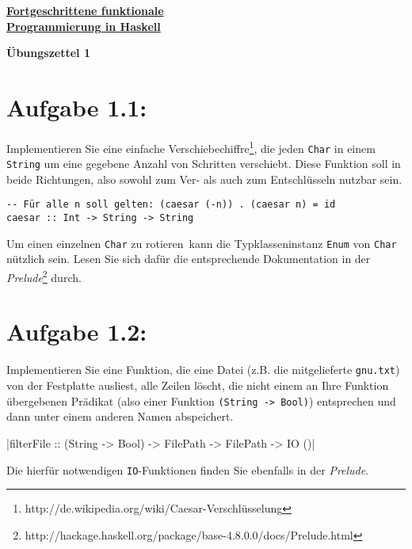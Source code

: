 \documentclass[a4paper,10pt]{scrartcl}
\newcommand{\underfat}[1]{\underline{\textbf{#1}}}
\newcommand{\theuebungszettel}{1}
\begin{document}
\begin{center}
  \begin{huge}
    \underfat{Fortgeschrittene funktionale}\\
    \underfat{Programmierung in Haskell}\\
  \end{huge}
\begin{LARGE}
\textbf{Übungszettel \theuebungszettel}

\end{LARGE}
\end{center}

\section*{Aufgabe \theuebungszettel.1:}

Implementieren Sie eine einfache Verschiebechiffre\footnote{http://de.wikipedia.org/wiki/Caesar-Verschlüsselung}, die jeden \texttt{Char} in einem \texttt{String} um eine gegebene Anzahl von Schritten verschiebt. Diese Funktion soll \glqq in beide Richtungen\grqq , also sowohl zum Ver- als auch zum Entschlüsseln nutzbar sein.

\begin{verbatim}
-- Für alle n soll gelten: (caesar (-n)) . (caesar n) = id 
caesar :: Int -> String -> String
\end{verbatim}

Um einen einzelnen \texttt{Char} zu \glqq rotieren\grqq\ kann die Typklasseninstanz \texttt{Enum} von \texttt{Char} nützlich sein. Lesen Sie sich dafür die entsprechende Dokumentation in der \emph{Prelude}\footnote{http://hackage.haskell.org/package/base-4.8.0.0/docs/Prelude.html} durch.

\section*{Aufgabe \theuebungszettel.2:}

Implementieren Sie eine Funktion, die eine Datei (z.B. die mitgelieferte \texttt{gnu.txt}) von der Festplatte ausliest, alle Zeilen löscht, die nicht einem an Ihre Funktion übergebenen Prädikat (also einer Funktion \texttt{(String -> Bool)}) entsprechen und dann unter einem anderen Namen abspeichert.

|filterFile :: (String -> Bool) -> FilePath -> FilePath -> IO ()|

Die hierfür notwendigen \texttt{IO}-Funktionen finden Sie ebenfalls in der \emph{Prelude}.
\end{document}
